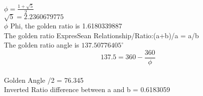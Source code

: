 \documentclass{article} %
\begin{document}
%
$\phi = \frac{1 + \sqrt{5}}{2}$
\\ %
$\sqrt{5}=2.2360679775$
\\
\newcommand{\goldenratio}{1.6180339887}
$\phi$ Phi, the golden ratio is \goldenratio
\\
The golden ratio ExpresSean Relationship/Ratio:(a+b)/a = a/b
\\
The golden ratio angle is \ensuremath{137.50776405^\circ}
\\
\begin{equation}
    137.5 = 360 - \frac{360}{\phi}
\end{equation}
\\
Golden Angle /2 = 76.345
\\
Inverted Ratio difference between a and b = 0.6183059
\\
\end{document}
